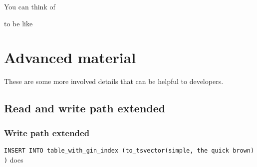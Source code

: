 \documentclass[
]{article}
\newenvironment{Shaded}{}{}
\newcommand{\KeywordTok}[1]{\textcolor[rgb]{0.00,0.44,0.13}{\textbf{#1}}}
\newcommand{\NormalTok}[1]{#1}
\newcommand{\OperatorTok}[1]{\textcolor[rgb]{0.40,0.40,0.40}{#1}}
\newcommand{\StringTok}[1]{\textcolor[rgb]{0.25,0.44,0.63}{#1}}
\begin{document}
You can think of

\begin{Shaded}
\end{Shaded}

to be like

\begin{Shaded}
\end{Shaded}

\hypertarget{advanced-material}{%
\section{Advanced material}\label{advanced-material}}

These are some more involved details that can be helpful to developers.

\hypertarget{read-and-write-path-extended}{%
\subsection{Read and write path
extended}\label{read-and-write-path-extended}}

\hypertarget{write-path-extended}{%
\subsubsection{Write path extended}\label{write-path-extended}}

\texttt{INSERT\ INTO\ table\_with\_gin\_index\ (to\_tsvector(\textquotesingle{}simple\textquotesingle{},\ \textquotesingle{}the\ quick\ brown\textquotesingle{}))}
does
\end{document}
